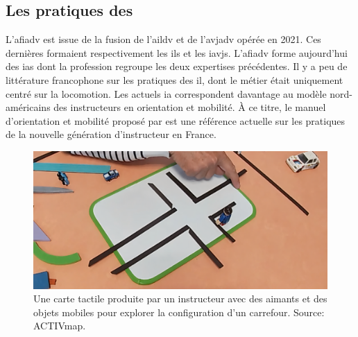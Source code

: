 
\subsection{Les pratiques des \ipas{}}

\label{pratiques_ipas}

L'\gls{afiadv} est issue de la fusion de l'\gls{aildv} et de l'\gls{avjadv} opérée en 2021. Ces dernières formaient respectivement les \glspl{il} et les \glspl{iavj}. L'\gls{afiadv} forme aujourd'hui des \glspl{ia} dont la profession regroupe les deux expertises précédentes. Il y a peu de littérature francophone sur les pratiques des \gls{il}, dont le métier était uniquement centré sur la locomotion. Les actuels \gls{ia} correspondent davantage au modèle nord-américains des instructeurs en orientation et mobilité. À ce titre, le manuel d'orientation et mobilité proposé par \citet{ratelle_manuel_2019} est une référence actuelle sur les pratiques de la nouvelle génération d'instructeur en France.

\begin{figure}[ht]
    \centering
    \includegraphics[width=\textwidth]{images/etat_art/carte_didier.png}
    \caption[Carte tactile produite avec des aimants]{Une carte tactile produite par un instructeur avec des aimants et des objets mobiles pour explorer la configuration d'un carrefour. Source: ACTIVmap.}
    \label{fig:il_carte}
\end{figure}

\newpar{}

